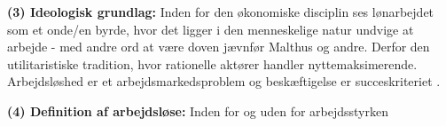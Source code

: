 \noindent \textbf{(3) Ideologisk grundlag:} Inden for den økonomiske disciplin ses lønarbejdet som et onde/en byrde, hvor det ligger i den menneskelige natur undvige at arbejde - med andre ord at være doven jævnfør Malthus og andre. Derfor den utilitaristiske tradition, hvor rationelle aktører handler nyttemaksimerende. Arbejdsløshed er et arbejdsmarkedsproblem og beskæftigelse er succeskriteriet \parencite[26]{Halvorsen1999}.


\noindent \textbf{(4) Definition af arbejdsløse:} Inden for og uden for arbejdsstyrken \parencite[592-601]{Mankiw2011}


